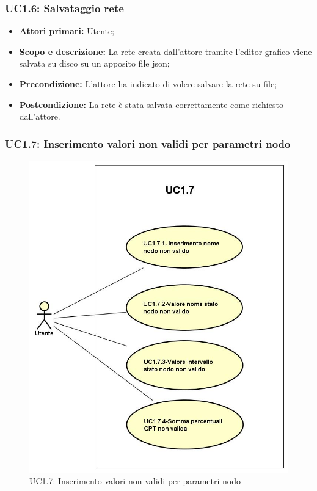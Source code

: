 \subsubsection{UC1.6: Salvataggio rete} 
\begin{itemize} 
	\item{\textbf{Attori primari:} Utente;} 
	\item{\textbf{Scopo e descrizione:} La rete creata dall'attore tramite l'editor grafico viene salvata su disco su un apposito file json;} 
	\item{\textbf{Precondizione:} L'attore ha indicato di volere salvare la rete su file;} 
	\item{\textbf{Postcondizione:} La rete è stata salvata correttamente come richiesto dall'attore.} 
\end{itemize} 
\subsubsection{UC1.7: Inserimento valori non validi per parametri nodo}
\begin{figure} [H]
	\centering
	\includegraphics[scale=0.45]{Img/UC1-7} 
	\caption{UC1.7: Inserimento valori non validi per parametri nodo} \label{} 
\end{figure}
